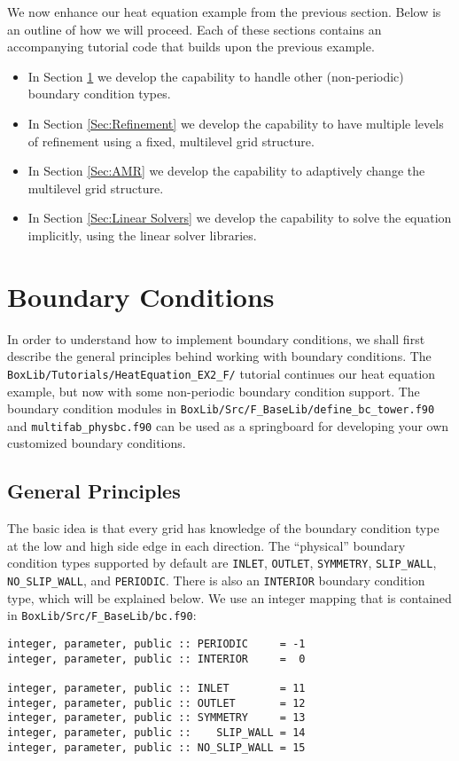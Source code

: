We now enhance our heat equation example from the previous section.
Below is an outline of how we will proceed.  Each of these sections contains an 
accompanying tutorial code that builds upon the previous example.
\begin{itemize}

\item In Section \ref{Sec:Boundary Conditions} we develop the capability to handle
other (non-periodic) boundary condition types.

\item In Section \ref{Sec:Refinement} we develop the capability to have multiple
levels of refinement using a fixed, multilevel grid structure.

\item In Section \ref{Sec:AMR} we develop the capability to adaptively change the
multilevel grid structure.

\item In Section \ref{Sec:Linear Solvers} we develop the capability to solve the
equation implicitly, using the linear solver libraries.

\end{itemize}

\section{Boundary Conditions}\label{Sec:Boundary Conditions}
In order to understand how to implement boundary conditions, we shall 
first describe the general principles behind working with boundary conditions.
The {\tt BoxLib/Tutorials/HeatEquation\_EX2\_F/} tutorial continues our heat
equation example, but now with some non-periodic boundary condition support.  The boundary
condition modules in {\tt BoxLib/Src/F\_BaseLib/define\_bc\_tower.f90} and {\tt multifab\_physbc.f90} 
can be used as a springboard for developing your own customized boundary conditions.

\subsection{General Principles}
The basic idea is that every grid has knowledge of the
boundary condition type at the low and high side edge in each direction.
The ``physical'' boundary condition types supported by default are {\tt INLET}, {\tt OUTLET},
{\tt SYMMETRY}, {\tt SLIP\_WALL}, {\tt NO\_SLIP\_WALL}, and {\tt PERIODIC}.
There is also an {\tt INTERIOR} boundary condition type, which 
will be explained below.  We use an integer mapping that is 
contained in {\tt BoxLib/Src/F\_BaseLib/bc.f90}:
\begin{lstlisting}[backgroundcolor=\color{light-green}]
integer, parameter, public :: PERIODIC     = -1
integer, parameter, public :: INTERIOR     =  0

integer, parameter, public :: INLET        = 11
integer, parameter, public :: OUTLET       = 12
integer, parameter, public :: SYMMETRY     = 13
integer, parameter, public ::    SLIP_WALL = 14
integer, parameter, public :: NO_SLIP_WALL = 15
\end{lstlisting}

